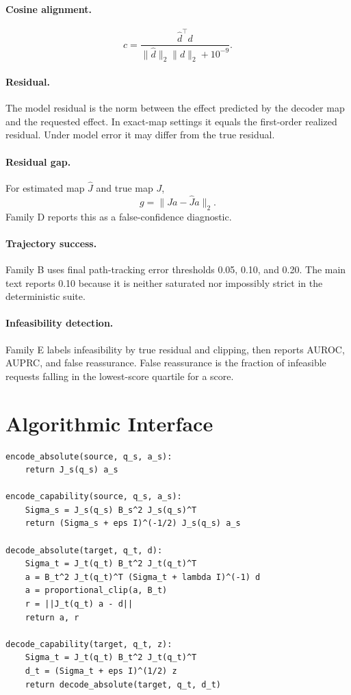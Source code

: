 \documentclass{article}
\begin{document}
\paragraph{Cosine alignment.}
\begin{equation}
c=\frac{\hat{d}^\top d}{\|\hat{d}\|_2\|d\|_2+10^{-9}}.
\end{equation}

\paragraph{Residual.}
The model residual is the norm between the effect predicted by the decoder map and the requested effect. In exact-map settings it equals the first-order realized residual. Under model error it may differ from the true residual.

\paragraph{Residual gap.}
For estimated map $\hat{J}$ and true map $J$,
\begin{equation}
g=\|Ja-\hat{J}a\|_2.
\end{equation}
Family D reports this as a false-confidence diagnostic.

\paragraph{Trajectory success.}
Family B uses final path-tracking error thresholds 0.05, 0.10, and 0.20. The main text reports 0.10 because it is neither saturated nor impossibly strict in the deterministic suite.

\paragraph{Infeasibility detection.}
Family E labels infeasibility by true residual and clipping, then reports AUROC, AUPRC, and false reassurance. False reassurance is the fraction of infeasible requests falling in the lowest-score quartile for a score.

\section{Algorithmic Interface}

\begin{verbatim}
encode_absolute(source, q_s, a_s):
    return J_s(q_s) a_s

encode_capability(source, q_s, a_s):
    Sigma_s = J_s(q_s) B_s^2 J_s(q_s)^T
    return (Sigma_s + eps I)^(-1/2) J_s(q_s) a_s

decode_absolute(target, q_t, d):
    Sigma_t = J_t(q_t) B_t^2 J_t(q_t)^T
    a = B_t^2 J_t(q_t)^T (Sigma_t + lambda I)^(-1) d
    a = proportional_clip(a, B_t)
    r = ||J_t(q_t) a - d||
    return a, r

decode_capability(target, q_t, z):
    Sigma_t = J_t(q_t) B_t^2 J_t(q_t)^T
    d_t = (Sigma_t + eps I)^(1/2) z
    return decode_absolute(target, q_t, d_t)
\end{verbatim}
\end{document}
